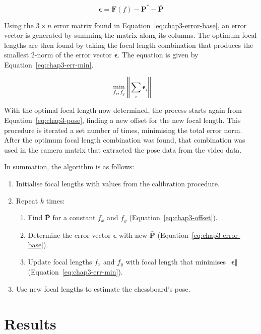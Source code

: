 \begin{equation}
  \label{eq:chap3-error-base}
  \bm{\epsilon} = \bm{F}(f) - \bm{P}^* - \bar{\bm{P}}
\end{equation}

Using the $3\times n$ error matrix found in Equation~\ref{eq:chap3-error-base}, an error vector is generated by summing the matrix along its columns. The optimum focal lengths are then found by taking the focal length combination that produces the smallest 2-norm of the error vector $\bm{\epsilon}$. The equation is given by Equation~\ref{eq:chap3-err-min}.

\begin{equation}
  \label{eq:chap3-err-min}
  \min_{f_x, f_y}\left \Vert \sum_i  \bm{\epsilon}_i \right \Vert
\end{equation}

With the optimal focal length now determined, the process starts again from Equation~\ref{eq:chap3-pose}, finding a new offset for the new focal length. This procedure is iterated a set number of times, minimising the total error norm. After the optimum focal length combination was found, that combination was used in the camera matrix that extracted the pose data from the video data.

In summation, the algorithm is as follows:

\begin{enumerate}
  \item Initialise focal lengths with values from the calibration procedure. 
  \item Repeat $k$ times:
  \begin{enumerate}
    \item Find $\bar{\bm{P}}$ for a constant $f_x$ and $f_y$ (Equation~\ref{eq:chap3-offset}).
    \item Determine the error vector $\bm{\epsilon}$ with new $\bar{\bm{P}}$ (Equation~\ref{eq:chap3-error-base}).
    \item Update focal lengths $f_x$ and $f_y$ with focal length that minimises $\left \Vert \bm{\epsilon} \right \Vert$ (Equation~\ref{eq:chap3-err-min}).
  \end{enumerate}
  \item Use new focal lengths to estimate the chessboard's pose.
\end{enumerate}

\section{Results}

